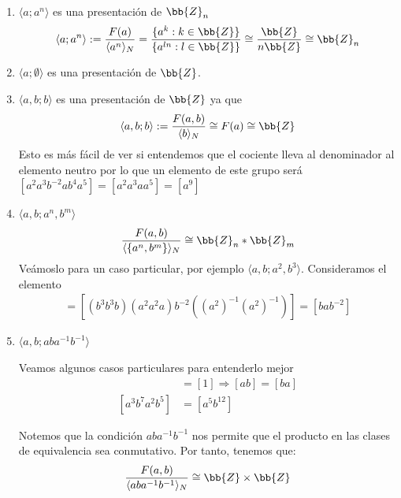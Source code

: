\begin{ejemplo}\
    \begin{enumerate}
        \item $\langle a; a^n \rangle$ es una presentación de $\bb{Z}_n$
        \begin{gather*}
            \langle a; a^n \rangle:=\frac{F(a)}{\langle a^n \rangle_N} = \frac{\{a^k : k\in \bb{Z}\}}{\{a^{ln} : l\in \bb{Z}\}} \cong \frac{\bb{Z}}{n\bb{Z}} \cong \bb{Z}_n
        \end{gather*}

        \item $\langle a; \emptyset \rangle$ es una presentación de $\bb{Z}$.
        \item $\langle a,b ; b\rangle$ es una presentación de $\bb{Z}$ ya que
        \begin{gather*}
            \langle a,b ; b\rangle:=\frac{F(a,b)}{\langle b \rangle_N} \cong F(a) \cong \bb{Z}
        \end{gather*}
        Esto es más fácil de ver si entendemos que el cociente lleva al denominador al elemento neutro por lo que un elemento de este grupo será $[a^2a^3b^{-2} a b^{4} a^5] = [a^2a^3a a^5] = [a^9]$

        \item $\langle a,b;a^n,b^m \rangle$
        \begin{gather*}
            \frac{F(a,b)}{\langle \{a^n, b^m\} \rangle_N} \cong \bb{Z}_n \ast \bb{Z}_m
        \end{gather*}
        Veámoslo para un caso particular, por ejemplo $\langle a, b; a^2,b^3\rangle$. Consideramos el elemento
        \begin{gather*}
            [b^7a^5b^{-2}a^{-4}] =[ (b^3b^3b)(a^2a^2a)b^{-2}((a^2)^{-1}(a^2)^{-1})] =[bab^{-2}]
        \end{gather*}

        \item $\langle a,b; aba^{-1}b^{-1} \rangle$
        
        Veamos algunos casos particulares para entenderlo mejor
        \begin{align*}
            [aba^{-1}b^{-1}] &= [1] \Longrightarrow [ab] = [ba]\\
            [a^3b^7a^2b^5] &= [a^5b^{12}]
        \end{align*}

        Notemos que la condición $aba^{-1}b^{-1}$ nos permite que el producto en las clases de equivalencia sea conmutativo. Por tanto, tenemos que:
        \begin{gather*}
            \frac{F(a,b)}{\langle aba^{-1}b^{-1} \rangle_N} \cong \bb{Z}\times \bb{Z}
        \end{gather*}


\end{enumerate}
\end{ejemplo}

